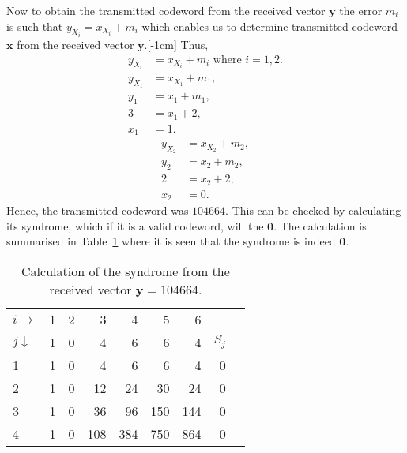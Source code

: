 Now to obtain the transmitted codeword from the received vector $\bm{y}$ the error $m_i$ is such that $y_{X_{i}}=x_{X_{i}} + m_i$ which enables us to determine transmitted codeword $\bm{x}$ from the received vector $\bm{y}$.[-1cm] Thus,
\begin{align*}
	y_{X_{i}}&=x_{X_{i}} + m_i \text{ where } i= 1,2.\\
	y_{X_{1}}&=x_{X_{1}} + m_1,\\
	y_1 &= x_1 + m_1,\\
	3 &= x_1 + 2,\\
	x_1 &= 1.
\end{align*}
\begin{align*}
	y_{X_{2}}&=x_{X_{2}} + m_2,\\
	y_2 &= x_2 + m_2,\\
	2 &= x_2 + 2,\\
	x_2 &= 0.
\end{align*}
Hence, the transmitted codeword was $104664$. This can be checked by calculating its syndrome, which if it is a valid codeword, will the $\bm{0}$. The calculation is summarised in Table~\ref{tab:3} where it is seen that the syndrome is indeed $\bm{0}$.
\begin{table}[!htp]\centering
\begin{tabular}{l|rrrrrr|rr}\toprule
$i\rightarrow$ &1 &2 &3 &4 &5 &6 & \\\cmidrule{1-7}
$j\downarrow$ &1 &0 &4 &6 &6 &4 &$S_j$ \\\midrule
1 &1 &0 &4 &6 &6 &4 &0 \\
2 &1 &0 &12 &24 &30 &24 &0 \\
3 &1 &0 &36 &96 &150 &144 &0 \\
4 &1 &0 &108 &384 &750 &864 &0 \\
\bottomrule
\end{tabular}
\caption{Calculation of the syndrome from the received vector $\bm{y}=104664$.}\label{tab:3}
\end{table}


